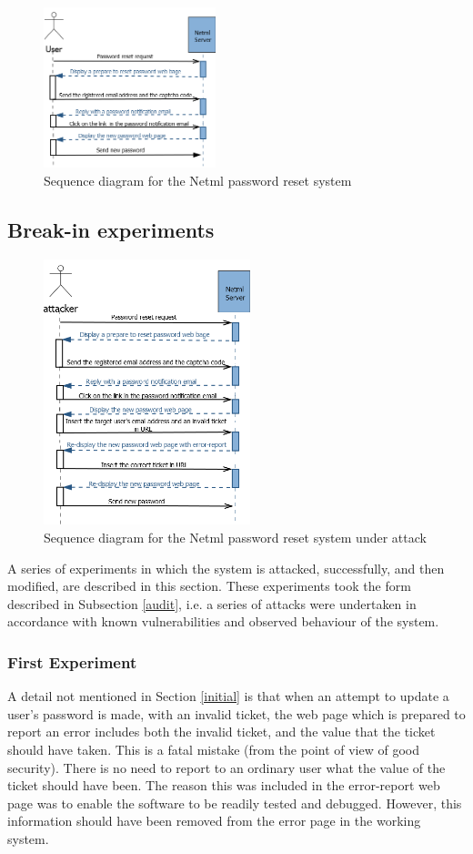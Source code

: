 \begin{figure}
	\centering
		\includegraphics[width=5cm]{figures/User.png}
\caption{Sequence diagram for the Netml password reset  system }
\label{seqdgnetmlorg}
\end{figure}
	

\subsection{Break-in experiments}\label{brkexpts}
\begin{figure}
	\centering
		\includegraphics[width=6cm]{figures/attacker.png}
\caption{Sequence diagram for the Netml password reset  system under attack }
\label{seqdgnetmlattack}
\end{figure}
A series of experiments in which the system is attacked,
successfully, and then modified, are described in this section.
These experiments took the form described in Subsection \ref{audit},
i.e. a series of attacks were undertaken in accordance with known
vulnerabilities and observed behaviour of the system.

\subsubsection{First Experiment}
A detail not mentioned in Section \ref{initial} is that when an attempt
to update a user's password is made, with an invalid ticket, the web 
page which is prepared to report an error includes both the invalid
ticket, and the value that the ticket should have taken. This is a fatal
mistake (from the point of view of good security). There is no need
to report to an ordinary user what the value of the ticket should
have been. The reason this was included in the error-report web page
was to enable the software to be readily tested and debugged. However,
this information should have been removed from the error page
in the working system.

